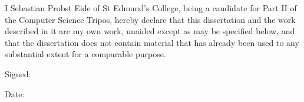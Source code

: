 \begin{flushleft}{

I Sebastian Probst Eide of St Edmund's College, being a candidate for Part II of the Computer Science Tripos, hereby declare that this dissertation and the work described in it are my own work, unaided except as may be specified below, and that the dissertation does not contain material that has already been used to any substantial extent for a comparable purpose.

\vspace*{15mm}
Signed: 

\vspace*{5mm}
Date: 

} \end{flushleft}
